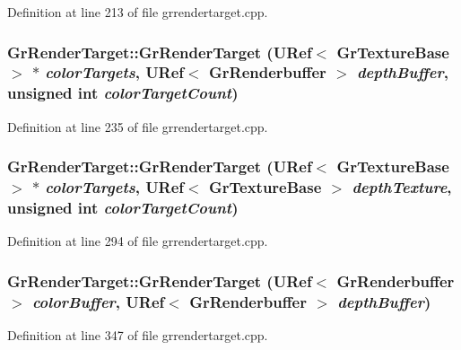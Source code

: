 \begin{CompactItemize}
Definition at line 213 of file grrendertarget.cpp.\hypertarget{class_gr_render_target_a2483dfaba49b2e626ea87fe05d24b38}{
\subsubsection[{GrRenderTarget}]{\setlength{\rightskip}{0pt plus 5cm}GrRenderTarget::GrRenderTarget ({\bf URef}$<$ {\bf GrTextureBase} $>$ $\ast$ {\em colorTargets}, \/  {\bf URef}$<$ {\bf GrRenderbuffer} $>$ {\em depthBuffer}, \/  unsigned int {\em colorTargetCount})}}
\label{class_gr_render_target_a2483dfaba49b2e626ea87fe05d24b38}




Definition at line 235 of file grrendertarget.cpp.\hypertarget{class_gr_render_target_7025c93b7eedd75c73ef5956b3a815d0}{
\subsubsection[{GrRenderTarget}]{\setlength{\rightskip}{0pt plus 5cm}GrRenderTarget::GrRenderTarget ({\bf URef}$<$ {\bf GrTextureBase} $>$ $\ast$ {\em colorTargets}, \/  {\bf URef}$<$ {\bf GrTextureBase} $>$ {\em depthTexture}, \/  unsigned int {\em colorTargetCount})}}
\label{class_gr_render_target_7025c93b7eedd75c73ef5956b3a815d0}




Definition at line 294 of file grrendertarget.cpp.\hypertarget{class_gr_render_target_bc4280eaa1d58bed60250fcbfda56557}{
\subsubsection[{GrRenderTarget}]{\setlength{\rightskip}{0pt plus 5cm}GrRenderTarget::GrRenderTarget ({\bf URef}$<$ {\bf GrRenderbuffer} $>$ {\em colorBuffer}, \/  {\bf URef}$<$ {\bf GrRenderbuffer} $>$ {\em depthBuffer})}}
\label{class_gr_render_target_bc4280eaa1d58bed60250fcbfda56557}




Definition at line 347 of file grrendertarget.cpp.\hypertarget{class_gr_render_target_734fdac5e2128109017b6d3d7abac6b5}{
}
\end{CompactItemize}
